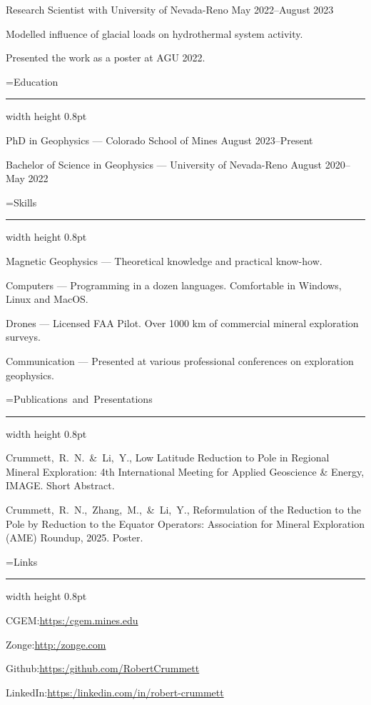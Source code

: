 \noindent
{\twelverm\fontspacing Research Scientist with University of Nevada-Reno}
\hfill{\eightit\fontspacing May 2022--August 2023}

\kern-4pt
\beginenumerate
\item Modelled influence of glacial loads on hydrothermal system activity.
\item Presented the work as a poster at AGU 2022.
\endenumerate
\medskip

=\hbox{\sixteenrm\fontspacing Education}
{}
\kern1.5pt
\hrule width  height 0.8pt
\medskip

\noindent
{\twelverm\fontspacing PhD in Geophysics --- Colorado School of Mines}
\hfill{\eightit\fontspacing August 2023--Present}

\kern2pt
\noindent
{}
\medskip

\noindent
{\twelverm\fontspacing Bachelor of Science in Geophysics --- University of Nevada-Reno}
\hfill{\eightit\fontspacing August 2020--May 2022}
\medskip

=\hbox{\sixteenrm\fontspacing Skills}
{}
\kern1.5pt
\hrule width  height 0.8pt

\beginenumerate
\item Magnetic Geophysics --- Theoretical knowledge and practical know-how.
\item Computers --- Programming in a dozen languages.
Comfortable in Windows, Linux and MacOS.
\item Drones --- Licensed FAA Pilot.
Over 1000 km of commercial mineral exploration surveys.
\item Communication --- Presented at various professional conferences on exploration geophysics.
\endenumerate
\smallskip

=\hbox{\sixteenrm\fontspacing Publications and Presentations}
{}
\kern1.5pt
\hrule width  height 0.8pt

\beginenumerate
\item Crummett,~R.~N.~\&~Li,~Y., Low Latitude Reduction to Pole in Regional Mineral Exploration:  4th International Meeting for Applied Geoscience \& Energy, IMAGE. Short Abstract.
\smallskip
\item Crummett,~R.~N.,~Zhang,~M.,~\&~Li,~Y., Reformulation of the Reduction to the Pole by Reduction to the Equator Operators: Association for Mineral Exploration (AME) Roundup, 2025. Poster.
\endenumerate
\smallskip

=\hbox{\sixteenrm\fontspacing Links}
{}
\kern1.5pt
\hrule width  height 0.8pt
\medskip

\noindent
{\ninebf CGEM:}\quad \url{https:/cgem.mines.edu}

\noindent
{\ninebf Zonge:}\quad \url{http:/zonge.com}

\noindent
{\ninebf Github:}\quad \url{https:/github.com/RobertCrummett}

\noindent
{\ninebf LinkedIn:}\quad \url{https:/linkedin.com/in/robert-crummett}
\bye
